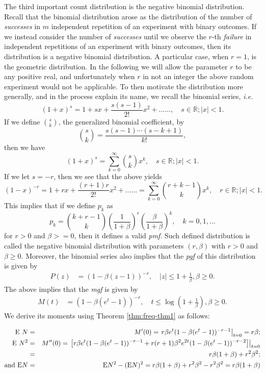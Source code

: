 \documentclass[]{book}
\theoremstyle{definition}
\theoremstyle{definition}
\theoremstyle{definition}
\theoremstyle{remark}
\begin{document}
The third important count distribution is the negative binomial
distribution. Recall that the binomial distribution arose as the
distribution of the number of \emph{successes} in \(m\) independent
repetition of an experiment with binary outcomes. If we instead consider
the number of \emph{successes} until we observe the \(r\)-th
\emph{failure} in independent repetitions of an experiment with binary
outcomes, then its distribution is a negative binomial distribution. A
particular case, when \(r=1\), is the geometric distribution. In the
following we will allow the parameter \(r\) to be any positive real, and
unfortunately when \(r\) in not an integer the above random experiment
would not be applicable. To then motivate the distribution more
generally, and in the process explain its name, we recall the binomial
series, \emph{i.e.} \[
(1+x)^s= 1 + s x + \frac{s(s-1)}{2!}x^2 + \ldots..., \quad s\in\mathbb{R}; \vert x \vert<1.
\] If we define \(\binom{s}{k}\), the generalized binomial coefficient,
by \[
\binom{s}{k}=\frac{s(s-1)\cdots(s-k+1)}{k!},
\] then we have \[
(1+x)^s= \sum_{k=0}^{\infty} \binom{s}{k} x^k, \quad s\in\mathbb{R}; \vert x \vert<1.
\] If we let \(s=-r\), then we see that the above yields \[
(1-x)^{-r}= 1 + r x + \frac{(r+1)r}{2!}x^2 + \ldots...= \sum_{k=0}^\infty \binom{r+k-1}{k} x^k, \quad r\in\mathbb{R}; \vert x \vert<1.
\] This implies that if we define \(p_k\) as \[
p_k = \binom{k+r-1}{k} \left(\frac{1}{1+\beta}\right)^r \left(\frac{\beta}{1+\beta}\right)^k, \quad k=0,1,\ldots
\] for \(r>0\) and \(\beta>=0\), then it defines a valid \emph{pmf}.
Such defined distribution is called the negative binomial distribution
with parameters \((r,\beta)\) with \(r>0\) and \(\beta\geq 0\).
Moreover, the binomial series also implies that the \emph{pgf} of this
distribution is given by \[
\begin{aligned}
  P(z) &= (1-\beta(z-1))^{-r}, \quad \vert z \vert \leq 1+\frac{1}{\beta}, \beta\geq0.
\end{aligned}
\] The above implies that the \emph{mgf} is given by \[
\begin{aligned}
  M(t) &= (1-\beta(e^t-1))^{-r}, \quad t \leq \log\left(1+\frac{1}{\beta}\right), \beta\geq0.
\end{aligned}
\] We derive its moments using Theorem \ref{thm:freq-thm1} as follows:

\begin{eqnarray*}
\mathrm{E}~{N}&=&M'(0)= \left. r\beta e^t (1-\beta(e^t-1))^{-r-1}\right\vert_{t=0}=r\beta;\\
\mathrm{E}~{N^2}&=&M''(0)= \left.\left[ r\beta e^t (1-\beta(e^t-1))^{-r-1} + r(r+1)\beta^2 e^{2t} (1-\beta(e^t-1))^{-r-2}\right]\right\vert_{t=0}\\
&=&r\beta(1+\beta)+r^2\beta^2;\\
\hbox{and }\mathrm{E}{N}&=&\mathrm{E}{N^2}-(\mathrm{E}{N})^2=r\beta(1+\beta)+r^2\beta^2-r^2\beta^2=r\beta(1+\beta)
\end{eqnarray*}
\end{document}
